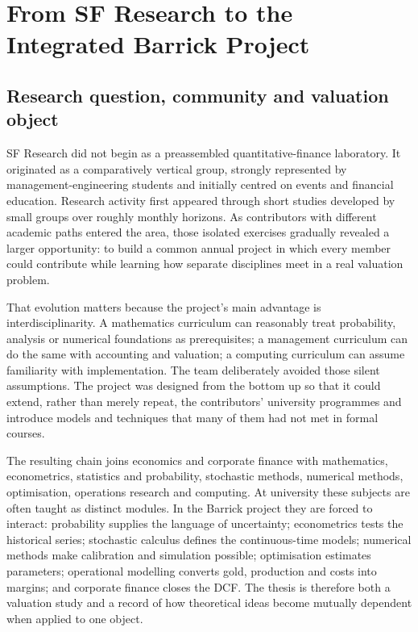 \chapter{From SF Research to the Integrated Barrick Project}

\section{Research question, community and valuation object}

SF Research did not begin as a preassembled quantitative-finance laboratory.
It originated as a comparatively vertical group, strongly represented by
management-engineering students and initially centred on events and financial
education. Research activity first appeared through short studies developed by
small groups over roughly monthly horizons. As contributors with different
academic paths entered the area, those isolated exercises gradually revealed a
larger opportunity: to build a common annual project in which every member
could contribute while learning how separate disciplines meet in a real
valuation problem.

That evolution matters because the project's main advantage is
interdisciplinarity. A mathematics curriculum can reasonably treat probability,
analysis or numerical foundations as prerequisites; a management curriculum
can do the same with accounting and valuation; a computing curriculum can
assume familiarity with implementation. The team deliberately avoided those
silent assumptions. The project was designed from the bottom up so that it
could extend, rather than merely repeat, the contributors' university
programmes and introduce models and techniques that many of them had not met
in formal courses.

The resulting chain joins economics and corporate finance with mathematics,
econometrics, statistics and probability, stochastic methods, numerical
methods, optimisation, operations research and computing. At university these
subjects are often taught as distinct modules. In the Barrick project they are
forced to interact: probability supplies the language of uncertainty;
econometrics tests the historical series; stochastic calculus defines the
continuous-time models; numerical methods make calibration and simulation
possible; optimisation estimates parameters; operational modelling converts
gold, production and costs into margins; and corporate finance closes the DCF.
The thesis is therefore both a valuation study and a record of how theoretical
ideas become mutually dependent when applied to one object.

